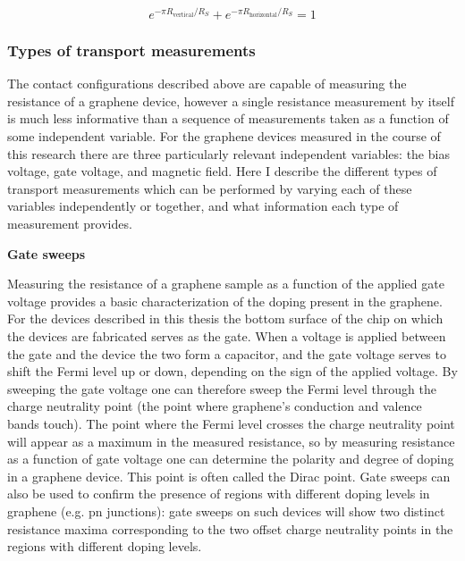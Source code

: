 \documentclass[edeposit,fullpage,draftthesis]{uiucthesis2009}
\begin{document}
            \begin{equation}
                e^{-\pi R_{\text{vertical}}/R_S}+e^{-\pi R_{\text{horizontal}}/R_S}=1
            \end{equation}
           
        \subsubsection*{Types of transport measurements}
        
            The contact configurations described above are capable of measuring the resistance of a graphene
            device, however a single resistance measurement by itself is much less informative than
            a sequence of measurements taken as a function of some independent variable. For the graphene
            devices measured in the course of this research there are three particularly relevant
            independent variables: the bias voltage, gate voltage, and magnetic field.
            Here I describe the different types of transport measurements which can be performed by 
            varying each of these variables independently or together, and what information each
            type of measurement provides.
            
            \textbf{Gate sweeps}
            
            Measuring the resistance of a graphene sample as a function of the applied gate voltage 
            provides a basic characterization of the doping present in the graphene. For the
            devices described in this thesis the bottom surface of the chip on which the devices
            are fabricated serves as the gate.
            When a voltage is applied between the gate and the device the two form a capacitor, and
            the gate voltage serves to shift the Fermi level up or down, depending on the sign of the applied voltage. 
            By sweeping the gate voltage one can therefore sweep
            the Fermi level through the charge neutrality point (the point where graphene's conduction and valence bands touch). 
            The point where the Fermi level crosses the charge neutrality point will appear as a maximum
            in the measured resistance, so by measuring resistance as a function of gate voltage one
            can determine the polarity and degree of doping in a graphene device. This point is often called
            the Dirac point. Gate sweeps can also be used to confirm the presence of regions with different
            doping levels in graphene (e.g. pn junctions): gate sweeps on such devices will show two distinct
            resistance maxima corresponding to the two offset charge neutrality points in the regions with
            different doping levels.
             
\end{document}
